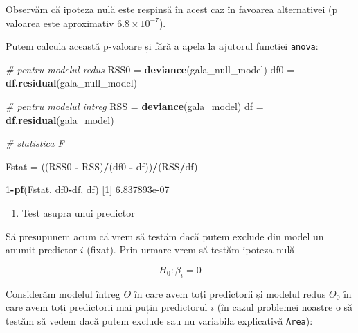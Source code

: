 \documentclass[]{article}
\newenvironment{Shaded}{\begin{snugshade}}{\end{snugshade}}
\newcommand{\KeywordTok}[1]{\textcolor[rgb]{0.13,0.29,0.53}{\textbf{#1}}}
\newcommand{\DecValTok}[1]{\textcolor[rgb]{0.00,0.00,0.81}{#1}}
\newcommand{\FloatTok}[1]{\textcolor[rgb]{0.00,0.00,0.81}{#1}}
\newcommand{\StringTok}[1]{\textcolor[rgb]{0.31,0.60,0.02}{#1}}
\newcommand{\CommentTok}[1]{\textcolor[rgb]{0.56,0.35,0.01}{\textit{#1}}}
\newcommand{\OperatorTok}[1]{\textcolor[rgb]{0.81,0.36,0.00}{\textbf{#1}}}
\newcommand{\NormalTok}[1]{#1}
\providecommand{\tightlist}{%
  \setlength{\itemsep}{0pt}\setlength{\parskip}{0pt}}
\begin{document}
Observăm că ipoteza nulă este respinsă în acest caz în favoarea
alternativei (p valoarea este aproximativ \(6.8\times 10^{-7}\)).

Putem calcula această p-valoare și fără a apela la ajutorul funcției
\texttt{anova}:

\begin{Shaded}
\begin{Highlighting}[]
\CommentTok{# pentru modelul redus }
\NormalTok{RSS0 =}\StringTok{ }\KeywordTok{deviance}\NormalTok{(gala_null_model)}
\NormalTok{df0 =}\StringTok{ }\KeywordTok{df.residual}\NormalTok{(gala_null_model)}

\CommentTok{# pentru modelul intreg}
\NormalTok{RSS =}\StringTok{ }\KeywordTok{deviance}\NormalTok{(gala_model)}
\NormalTok{df =}\StringTok{ }\KeywordTok{df.residual}\NormalTok{(gala_model)}

\CommentTok{# statistica F}

\NormalTok{Fstat =}\StringTok{ }\NormalTok{((RSS0 }\OperatorTok{-}\StringTok{ }\NormalTok{RSS)}\OperatorTok{/}\NormalTok{(df0 }\OperatorTok{-}\StringTok{ }\NormalTok{df))}\OperatorTok{/}\NormalTok{(RSS}\OperatorTok{/}\NormalTok{df)}

\DecValTok{1}\OperatorTok{-}\KeywordTok{pf}\NormalTok{(Fstat, df0}\OperatorTok{-}\NormalTok{df, df)}
\NormalTok{[}\DecValTok{1}\NormalTok{] }\FloatTok{6.837893e-07}
\end{Highlighting}
\end{Shaded}

\begin{enumerate}
\def\labelenumi{\alph{enumi})}
\setcounter{enumi}{1}
\tightlist
\item
  Test asupra unui predictor
\end{enumerate}

Să presupunem acum că vrem să testăm dacă putem exclude din model un
anumit predictor \(i\) (fixat). Prin urmare vrem să testăm ipoteza nulă

\[
H_0:\beta_i=0
\]

Considerăm modelul întreg \(\Theta\) în care avem toți predictorii și
modelul redus \(\Theta_0\) în care avem toți predictorii mai puțin
predictorul \(i\) (în cazul problemei noastre o să testăm să vedem dacă
putem exclude sau nu variabila explicativă \texttt{Area}):
\end{document}
